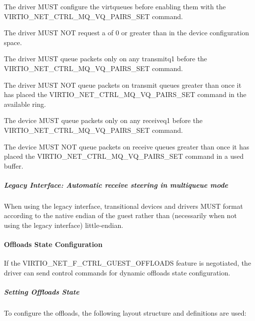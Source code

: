 The driver MUST configure the virtqueues before enabling them with the 
VIRTIO_NET_CTRL_MQ_VQ_PAIRS_SET command.

The driver MUST NOT request a  of 0 or
greater than  in the device configuration space.

The driver MUST queue packets only on any transmitq1 before the 
VIRTIO_NET_CTRL_MQ_VQ_PAIRS_SET command.

The driver MUST NOT queue packets on transmit queues greater than
 once it has placed the VIRTIO_NET_CTRL_MQ_VQ_PAIRS_SET command in the available ring.


The device MUST queue packets only on any receiveq1 before the 
VIRTIO_NET_CTRL_MQ_VQ_PAIRS_SET command.

The device MUST NOT queue packets on receive queues greater than
 once it has placed the
VIRTIO_NET_CTRL_MQ_VQ_PAIRS_SET command in a used buffer.

\subparagraph{Legacy Interface: Automatic receive steering in multiqueue mode}\label{sec:Device Types / Network Device / Device Operation / Control Virtqueue / Automatic receive steering in multiqueue mode / Legacy Interface: Automatic receive steering in multiqueue mode}
When using the legacy interface, transitional devices and drivers
MUST format 
according to the native endian of the guest rather than
(necessarily when not using the legacy interface) little-endian.

\paragraph{Offloads State Configuration}\label{sec:Device Types / Network Device / Device Operation / Control Virtqueue / Offloads State Configuration}

If the VIRTIO_NET_F_CTRL_GUEST_OFFLOADS feature is negotiated, the driver can
send control commands for dynamic offloads state configuration.

\subparagraph{Setting Offloads State}\label{sec:Device Types / Network Device / Device Operation / Control Virtqueue / Offloads State Configuration / Setting Offloads State}

To configure the offloads, the following layout structure and
definitions are used:

